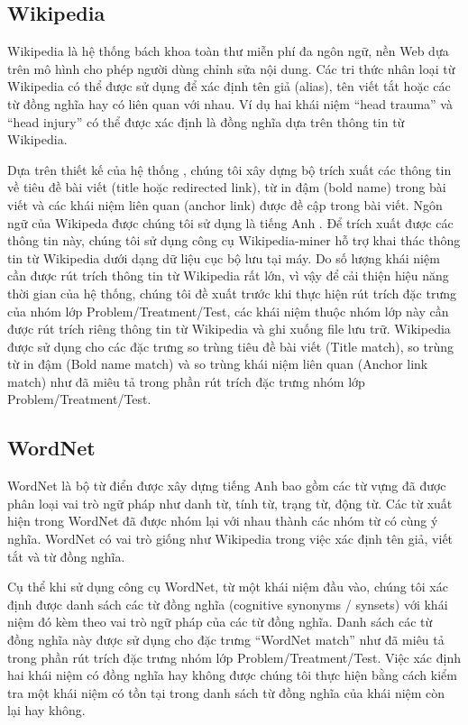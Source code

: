 \subsection*{Wikipedia}
Wikipedia là hệ thống bách khoa toàn thư miễn phí đa ngôn ngữ, nền Web dựa trên mô hình cho phép người dùng chỉnh sửa nội dung. Các tri thức nhân loại từ Wikipedia có thể được sử dụng để xác định tên giả (alias), tên viết tắt hoặc các từ đồng nghĩa hay có liên quan với nhau. Ví dụ hai khái niệm ``head trauma'' và ``head injury'' có thể được xác định là đồng nghĩa dựa trên thông tin từ Wikipedia.

Dựa trên thiết kế của hệ thống \cite{YanXu2012}, chúng tôi xây dựng bộ trích xuất các thông tin về tiêu đề bài viết (title hoặc redirected link), từ in đậm (bold name) trong bài viết và các khái niệm liên quan (anchor link) được đề cập trong bài viết. Ngôn ngữ của Wikipeda được chúng tôi sử dụng là tiếng Anh . Để trích xuất được các thông tin này, chúng tôi sử dụng công cụ Wikipedia-miner hỗ trợ khai thác thông tin từ Wikipedia dưới dạng dữ liệu cục bộ lưu tại máy. Do số lượng khái niệm cần được rút trích thông tin từ Wikipedia rất lớn, vì vậy để cải thiện hiệu năng thời gian của hệ thống, chúng tôi đề xuất trước khi thực hiện rút trích đặc trưng của nhóm lớp Problem/Treatment/Test, các khái niệm thuộc nhóm lớp này cần được rút trích riêng thông tin từ Wikipedia và ghi xuống file lưu trữ. Wikipedia được sử dụng cho các đặc trưng so trùng tiêu đề bài viết (Title match), so trùng từ in đậm (Bold name match) và so trùng khái niệm liên quan (Anchor link match) như đã miêu tả trong phần rút trích đặc trưng nhóm lớp Problem/Treatment/Test.

\subsection*{WordNet}
WordNet là bộ từ điển được xây dựng tiếng Anh bao gồm các từ vựng đã được phân loại vai trò ngữ pháp như danh từ, tính từ, trạng từ, động từ. Các từ xuất hiện trong WordNet đã được nhóm lại với nhau thành các nhóm từ có cùng ý nghĩa. WordNet có vai trò giống như Wikipedia trong việc xác định tên giả, viết tắt và từ đồng nghĩa.

Cụ thể khi sử dụng công cụ WordNet, từ một khái niệm đầu vào, chúng tôi xác định được danh sách các từ đồng nghĩa (cognitive synonyms / synsets) với khái niệm đó kèm theo vai trò ngữ pháp của các từ đồng nghĩa. Danh sách các từ đồng nghĩa này được sử dụng cho đặc trưng ``WordNet match'' như đã miêu tả trong phần rút trích đặc trưng nhóm lớp Problem/Treatment/Test. Việc xác định hai khái niệm có đồng nghĩa hay không được chúng tôi thực hiện bằng cách kiểm tra một khái niệm có tồn tại trong danh sách từ đồng nghĩa của khái niệm còn lại hay không.

